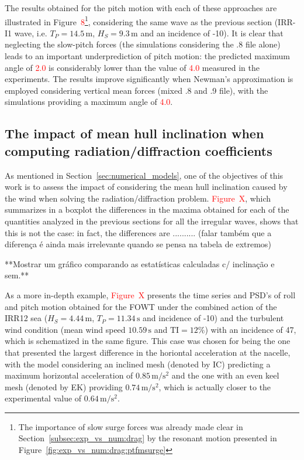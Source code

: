 The results obtained for the pitch motion with each of these approaches are illustrated in Figure~\textcolor{red}{8}\footnote{The importance of slow surge forces was already made clear in Section~\ref{subsec:exp_vs_num:drag} by the resonant motion presented in Figure~\ref{fig:exp_vs_num:drag:ptfmsurge}}, considering the same wave as the previous section (IRR-I1 wave, i.e. $T_P=14.5\,\text{m}$, $H_S=9.3\,\text{m}$ and an incidence of -10\textdegree{}). It is clear that neglecting the slow-pitch forces (the simulations considering the .8 file alone) leads to an important underprediction of pitch motion: the predicted maximum angle of \textcolor{red}{2.0\textdegree{}} is considerably lower than the value of \textcolor{red}{4.0\textdegree{}} measured in the experiments. The results improve significantly when Newman's approximation is employed considering vertical mean forces (mixed .8 and .9 file), with the simulations providing a maximum angle of \textcolor{red}{4.0\textdegree{}}.









\subsection{The impact of mean hull inclination when computing radiation/diffraction coefficients} \label{subsec:exp_vs_num:impact_inclination}
As mentioned in Section~\ref{sec:numerical_models}, one of the objectives of this work is to assess the impact of considering the mean hull inclination caused by the wind when solving the radiation/diffraction problem. \textcolor{red}{Figure~X}, which summarizes in a boxplot the differences in the maxima obtained for each of the quantities analyzed in the previous sections for all the irregular waves, shows that this is not the case: in fact, the differences are .......... (falar também que a diferença é ainda mais irrelevante quando se pensa na tabela de extremos)

**Mostrar um gráfico comparando as estatísticas calculadas c/ inclinação e sem.**

As a more in-depth example, \textcolor{red}{Figure~X} presents the time series and PSD's of roll and pitch motion obtained for the FOWT under the combined action of the IRR12 sea ($H_S=4.44\,\text{m}$, $T_P = 11.34\,\text{s}$ and incidence of -10\textdegree{}) and the turbulent wind condition (mean wind speed $10.59\,\text{s}$ and $\textrm{TI}=12\%$) with an incidence of 47\textdegree{}, which is schematized in the same figure. This case was chosen for being the one that presented the largest difference in the horiontal acceleration at the nacelle, with the model considering an inclined mesh (denoted by IC) predicting a maximum horizontal acceleration of $0.85\,\text{m}/\text{s}^2$ and the one with an even keel mesh (denoted by EK) providing $0.74\,\text{m}/\text{s}^2$, which is actually closer to the experimental value of $0.64\,\text{m}/\text{s}^2$. 

